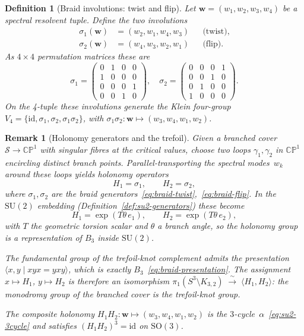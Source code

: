\documentclass[12pt,a4paper]{report}
\newtheorem{definition}[theorem]{Definition}
\newtheorem{remark}[theorem]{Remark}
\begin{document}
\begin{definition}[Braid involutions: twist and flip]
\label{def:braid-twist-flip}
Let $\mathbf{w}=(w_1,w_2,w_3,w_4)$ be a spectral resolvent tuple.
Define the two involutions
\begin{align}
  \sigma_1(\mathbf{w}) &= (w_2,w_1,w_4,w_3)
    &&\text{(twist),}
    \label{eq:braid-twist}\\[4pt]
  \sigma_2(\mathbf{w}) &= (w_4,w_3,w_2,w_1)
    &&\text{(flip).}
    \label{eq:braid-flip}
\end{align}
As $4\times 4$ permutation matrices these are
\begin{equation}\label{eq:perm-matrices}
  \sigma_1=\begin{pmatrix}
    0&1&0&0\\1&0&0&0\\0&0&0&1\\0&0&1&0
  \end{pmatrix},\quad
  \sigma_2=\begin{pmatrix}
    0&0&0&1\\0&0&1&0\\0&1&0&0\\1&0&0&0
  \end{pmatrix}.
\end{equation}
On the 4-tuple these involutions generate the Klein four-group
$V_4=\{\mathrm{id},\sigma_1,\sigma_2,\sigma_1\sigma_2\}$, with
$\sigma_1\sigma_2\colon\mathbf{w}\mapsto(w_3,w_4,w_1,w_2)$.
\end{definition}

\begin{remark}[Holonomy generators and the trefoil]
\label{rem:holonomy-trefoil}
Given a branched cover $\mathcal{S}\to\mathbb{CP}^1$ with singular fibres
at the critical values, choose two loops
$\gamma_1,\gamma_2$ in $\mathbb{CP}^1$ encircling distinct branch
points.  Parallel-transporting the spectral modes~$w_k$ around these
loops yields holonomy operators
\begin{equation}\label{eq:holonomy-generators}
  H_1=\sigma_1,\qquad H_2=\sigma_2,
\end{equation}
where $\sigma_1,\sigma_2$ are the braid
generators~\eqref{eq:braid-twist},~\eqref{eq:braid-flip}.  In the
$\mathrm{SU}(2)$ embedding (Definition~\ref{def:su2-generators}) these
become
\[
  H_1=\exp(T\theta\,e_1),\qquad H_2=\exp(T\theta\,e_2),
\]
with $T$ the geometric torsion scalar and $\theta$ a branch angle, so
the holonomy group is a representation of $B_3$ inside
$\mathrm{SU}(2)$.

The fundamental group of the trefoil-knot complement admits the
presentation $\langle x,y\mid xyx=yxy\rangle$, which is exactly
$B_3$~\eqref{eq:braid-presentation}.  The assignment
$x\mapsto H_1$, $y\mapsto H_2$ is therefore an isomorphism
$\pi_1(S^3\setminus K_{3,2})\;\xrightarrow{\;\sim\;}\;
\langle H_1,H_2\rangle$: the monodromy group of the branched cover
\emph{is} the trefoil-knot group.

The composite holonomy
$H_1 H_2\colon\mathbf{w}\mapsto(w_3,w_4,w_1,w_2)$ is the
$3$-cycle~$\alpha$~\eqref{eq:su2-3cycle} and satisfies
$(H_1 H_2)^3=\mathrm{id}$ on $\mathrm{SO}(3)$.
\end{remark}
\end{document}
